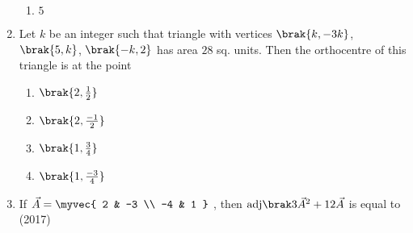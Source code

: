 \begin{enumerate}[label=\thesubsection.\arabic*.,ref=\thesubsection.\theenumi]
\begin{multicols}{4}
\begin{enumerate}
	   	\item $5$ 
	\end{enumerate}
\end{multicols}
	\item Let $k$ be an integer such that triangle with vertices $\brak{k, -3k}$, $\brak{5,k}$, $\brak{-k,2}$ has area $28$ sq. units. Then the orthocentre of this triangle is at the point
	\hfill{}
\begin{multicols}{4}
	\begin{enumerate}
	    	\item $\brak{2,\frac{1}{2}}$ 
	    	\item $\brak{2,\frac{-1}{2}}$ 
	     	\item $\brak{1,\frac{3}{4}}$ 
	    	\item $\brak{1,\frac{-3}{4}}$ 
	\end{enumerate}
\end{multicols}
\item If  $\vec{A}=\myvec{
    2 & -3 \\
    -4 & 1
}$
    , then $\adj{3\vec{A}^2+12\vec{A}}$ is equal to
\hfill{(2017)}
\begin{enumerate}
\end{enumerate}
\end{enumerate}
